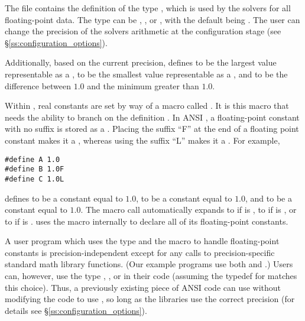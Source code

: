 %
The  file contains the definition of the type ,
which is used by the {\sundials} solvers for all floating-point data.
The type  can be , , or , with
the default being .
The user can change the precision of the {\sundials} solvers arithmetic at the
configuration stage (see \S\ref{ss:configuration_options}).

Additionally, based on the current precision,  defines 
 to be the largest value representable as a ,
 to be the smallest value representable as a , and
 to be the difference between $1.0$ and the minimum 
greater than $1.0$.

Within {\sundials}, real constants are set by way of a macro called
.  It is this macro that needs the ability to branch on the
definition .  In ANSI {\C}, a floating-point constant with no
suffix is stored as a .  Placing the suffix ``F'' at the
end of a floating point constant makes it a , whereas using the suffix
``L'' makes it a .  For example,
\begin{verbatim}
#define A 1.0
#define B 1.0F
#define C 1.0L
\end{verbatim}
defines  to be a  constant equal to $1.0$,  to be a
 constant equal to $1.0$, and  to be a  constant
equal to $1.0$.  The macro call  automatically expands to 
if  is , to  if  is ,
or to  if  is .  {\sundials} uses the
 macro internally to declare all of its floating-point constants. 

A user program which uses the type  and the  macro
to handle floating-point constants is precision-independent except for
any calls to precision-specific standard math library
functions.  (Our example programs use both  and
.)  Users can, however, use the type , , or
 in their code (assuming the typedef for  matches
this choice).  Thus, a previously existing piece of ANSI {\C} code can use
{\sundials} without modifying the code to use , so long
as the {\sundials} libraries use the correct precision (for details see
\S\ref{ss:configuration_options}).
